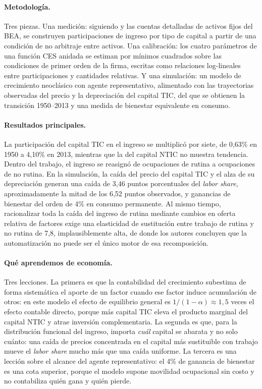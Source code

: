 \documentclass[12pt,letterpaper]{article}
\begin{document}
\paragraph{Metodología.}
Tres piezas. Una medición: siguiendo \citet{hall1967} y las cuentas detalladas de
activos fijos del BEA, se construyen participaciones de ingreso por tipo de capital
a partir de una condición de no arbitraje entre activos. Una calibración: los cuatro
parámetros de una función CES anidada se estiman por mínimos cuadrados sobre las
condiciones de primer orden de la firma, escritas como relaciones log-lineales entre
participaciones y cantidades relativas. Y una simulación: un modelo de crecimiento
neoclásico con agente representativo, alimentado con las trayectorias observadas del
precio y la depreciación del capital TIC, del que se obtienen la transición
1950--2013 y una medida de bienestar equivalente en consumo.

\paragraph{Resultados principales.}
La participación del capital TIC en el ingreso se multiplicó por siete, de 0,63\% en
1950 a 4,10\% en 2013, mientras que la del capital NTIC no muestra tendencia. Dentro
del trabajo, el ingreso se reasignó de ocupaciones de rutina a ocupaciones de no
rutina. En la simulación, la caída del precio del capital TIC y el alza de su
depreciación generan una caída de 3,46 puntos porcentuales del \emph{labor share},
aproximadamente la mitad de los 6,52 puntos observados, y ganancias de bienestar
del orden de 4\% en consumo permanente. Al mismo tiempo, racionalizar toda la caída
del ingreso de rutina mediante cambios en oferta relativa de factores exige una
elasticidad de sustitución entre trabajo de rutina y no rutina de 7,8, implausiblemente
alta, de donde los autores concluyen que la automatización no puede ser el único
motor de esa recomposición.

\paragraph{Qué aprendemos de economía.}
Tres lecciones. La primera es que la contabilidad del crecimiento subestima de forma
sistemática el aporte de un factor cuando ese factor induce acumulación de otros: en
este modelo el efecto de equilibrio general es $1/(1-\alpha)\approx 1{,}5$ veces el
efecto contable directo, porque más capital TIC eleva el producto marginal del capital
NTIC y atrae inversión complementaria. La segunda es que, para la distribución
funcional del ingreso, importa \emph{cuál} capital se abarata y no solo cuánto: una
caída de precios concentrada en el capital más sustituible con trabajo mueve el
\emph{labor share} mucho más que una caída uniforme. La tercera es una lección sobre
el alcance del agente representativo: el 4\% de ganancia de bienestar es una cota
superior, porque el modelo supone movilidad ocupacional sin costo y no contabiliza
quién gana y quién pierde.
\end{document}
